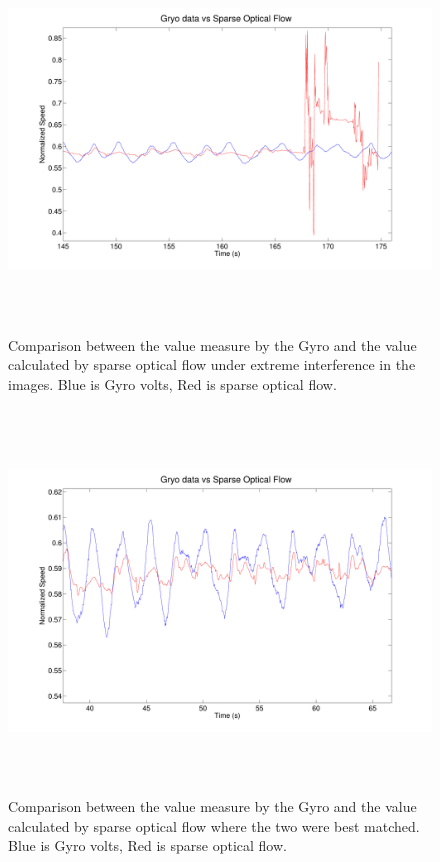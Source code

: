 \documentclass[conference, onecolumn, 12pt]{IEEEtran}
\begin{document}
\begin{figure}
\centering
\includegraphics[height=4in]{badtestcomp.pdf}
\caption{Comparison between the value measure by the Gyro and the value calculated by sparse optical flow under extreme interference in the images. Blue is Gyro volts, Red is sparse optical flow.}
\end{figure}

\begin{figure}
\centering
\includegraphics[height=4in]{goodtestcomp.pdf}
\caption{Comparison between the value measure by the Gyro and the value calculated by sparse optical flow where the two were best matched. Blue is Gyro volts, Red is sparse optical flow.}
\end{figure}
\end{document}
